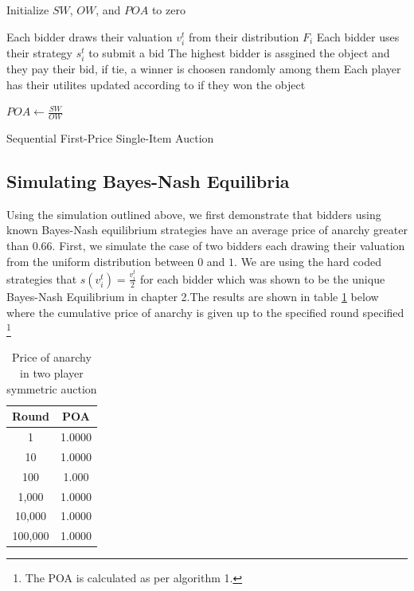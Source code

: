 \documentclass[12pt,twoside]{reedthesis}
\begin{document}
\begin{algorithm}[H]
	Initialize $SW$, $OW$, and $POA$ to zero\\
	{
		Each bidder draws their valuation $v^t_i$ from their distribution $F_i$\;
		Each bidder uses their strategy $s^t_i$ to submit a bid\;
		The highest bidder is assgined the object and they pay their bid, if tie, a winner is choosen randomly among them\;
		Each player has their utilites updated according to if they won the object\;
	
		$POA \leftarrow \frac{SW}{OW}$	
	\caption{Sequential First-Price Single-Item Auction}
	}
\end{algorithm}


\subsection{Simulating Bayes-Nash Equilibria}
Using the simulation outlined above, we first demonstrate that bidders using known Bayes-Nash equilibrium strategies have an average price of anarchy greater than $0.66$. First, we simulate the case of two bidders each drawing their valuation from the uniform distribution between $0$ and $1$. We are using the hard coded strategies that $s(v^t_i) = \frac{v^t_i}{2}$ for each bidder which was shown to be the unique Bayes-Nash Equilibrium in chapter 2.The results are shown in table \ref{table:1} below where the cumulative price of anarchy is given up to the specified round specified \footnote{The POA is calculated as per algorithm 1. %
}

\begin{table}[h!]
\begin{center}
\begin{tabular}{ |c|c| }
	\hline
	Round & POA \\
	\hline
	1 & 1.0000 \\
	10 & 1.0000 \\
	100 & 1.000 \\
	1,000 & 1.0000 \\
	10,000 & 1.0000 \\
	100,000 & 1.0000 \\
	\hline
\end{tabular}
\caption{Price of anarchy in two player symmetric auction}
\label{table:1}
\end{center} 
\end{table}
\end{document}

